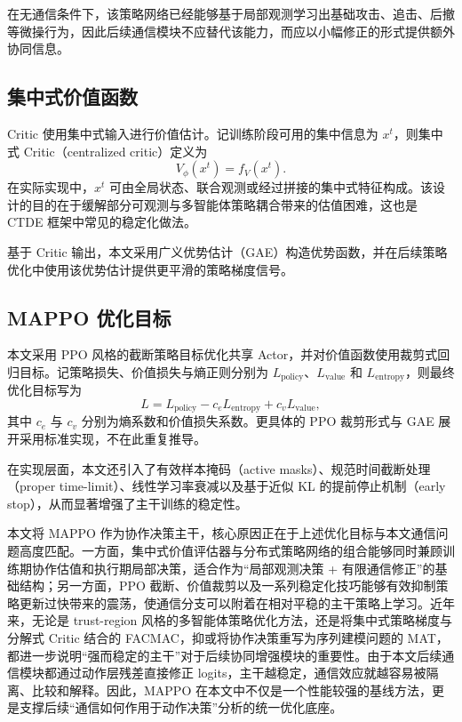 在无通信条件下，该策略网络已经能够基于局部观测学习出基础攻击、追击、后撤等微操行为，因此后续通信模块不应替代该能力，而应以小幅修正的形式提供额外协同信息。

\subsection{集中式价值函数}

Critic 使用集中式输入进行价值估计。记训练阶段可用的集中信息为 $x^t$，则集中式 Critic（centralized critic）定义为
\begin{equation}
V_{\phi}(x^t) = f_{V}(x^t).
\end{equation}
在实际实现中，$x^t$ 可由全局状态、联合观测或经过拼接的集中式特征构成。该设计的目的在于缓解部分可观测与多智能体策略耦合带来的估值困难，这也是 CTDE 框架中常见的稳定化做法\cite{foerster2018coma,lowe2017maddpg,yu2021mappo}。

基于 Critic 输出，本文采用广义优势估计（GAE）构造优势函数，并在后续策略优化中使用该优势估计提供更平滑的策略梯度信号。

\subsection{MAPPO 优化目标}

本文采用 PPO 风格的截断策略目标优化共享 Actor\cite{schulman2017ppo,yu2021mappo}，并对价值函数使用裁剪式回归目标。记策略损失、价值损失与熵正则分别为 $L_{\text{policy}}$、$L_{\text{value}}$ 和 $L_{\text{entropy}}$，则最终优化目标写为
\begin{equation}
L =
L_{\text{policy}}
 - c_e L_{\text{entropy}}
 + c_v L_{\text{value}},
\end{equation}
其中 $c_e$ 与 $c_v$ 分别为熵系数和价值损失系数。更具体的 PPO 裁剪形式与 GAE 展开采用标准实现，不在此重复推导。

在实现层面，本文还引入了有效样本掩码（active masks）、规范时间截断处理（proper time-limit）、线性学习率衰减以及基于近似 KL 的提前停止机制（early stop），从而显著增强了主干训练的稳定性。

本文将 MAPPO 作为协作决策主干，核心原因正在于上述优化目标与本文通信问题高度匹配\cite{yu2021mappo,schulman2017ppo}。一方面，集中式价值评估器与分布式策略网络的组合能够同时兼顾训练期协作估值和执行期局部决策，适合作为“局部观测决策 + 有限通信修正”的基础结构；另一方面，PPO 截断、价值裁剪以及一系列稳定化技巧能够有效抑制策略更新过快带来的震荡，使通信分支可以附着在相对平稳的主干策略上学习。近年来，无论是 trust-region 风格的多智能体策略优化方法\cite{kuba2022happo}，还是将集中式策略梯度与分解式 Critic 结合的 FACMAC\cite{peng2021facmac}，抑或将协作决策重写为序列建模问题的 MAT\cite{wen2022mat}，都进一步说明“强而稳定的主干”对于后续协同增强模块的重要性。由于本文后续通信模块都通过动作层残差直接修正 logits，主干越稳定，通信效应就越容易被隔离、比较和解释。因此，MAPPO 在本文中不仅是一个性能较强的基线方法，更是支撑后续“通信如何作用于动作决策”分析的统一优化底座。

